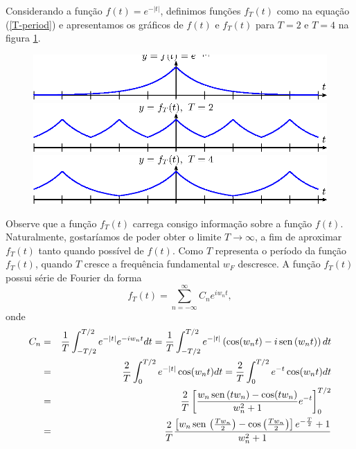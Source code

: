 \begin{ex}{\label{ex_Transf_1}} Considerando a função $f(t)=e^{-|t|}$, definimos funções $f_T(t)$ como na equação (\ref{T-period}) e apresentamos os gráficos de $f(t)$ e $f_T(t)$ para $T=2$ e $T=4$ na figura \ref{fig_T_tenda}.
\begin{figure}[!ht]
\begin{center}
\includegraphics{cap_transformada_de_fourier/pics/figura_1}
\includegraphics{cap_transformada_de_fourier/pics/figura_2}
\includegraphics{cap_transformada_de_fourier/pics/figura_3}\end{center}
\caption{\label{fig_T_tenda}}
\end{figure}
Observe que a função $f_T(t)$ carrega consigo informação sobre a função $f(t)$. Naturalmente, gostaríamos de poder obter o limite $T\to \infty$, a fim de aproximar $f_T(t)$ tanto quando possível de $f(t)$. Como $T$ representa o período da função $f_T(t)$, quando $T$ cresce a frequência fundamental $w_F$ descresce. A função $f_T(t)$ possui série de Fourier da forma
\begin{equation}
f_T(t)=\sum_{n=-\infty}^\infty C_n e^{iw_n t},
\end{equation}
onde
\begin{eqnarray}
 \nonumber C_n&=&\frac{1}{T}\int_{-T/2}^{T/2}e^{-|t|}e^{-iw_nt}dt = \frac{1}{T}\int_{-T/2}^{T/2}e^{-|t|}\left(\cos(w_nt)-i\sen(w_nt)\right)dt\\
 \nonumber &=&\frac{2}{T}\int_{0}^{T/2}e^{-|t|}\cos(w_nt)dt= \frac{2}{T}\int_{0}^{T/2}e^{-t}\cos(w_nt)dt\\
 \nonumber &=&\frac{2}{T}\left[\frac{ w_n \sen(t w_n)-\cos(t w_n)}{w_n^2+1}e^{-t}\right]_0^{T/2}\\
 \nonumber &=&\frac{2}{T}\frac{ \left[w_n \sen\left(\frac{Tw_n}{2}\right)-\cos\left(\frac{Tw_n}{2}\right)\right]e^{-\frac{T}{2}}+1}{w_n^2+1}\\

\end{eqnarray}
\end{ex}
